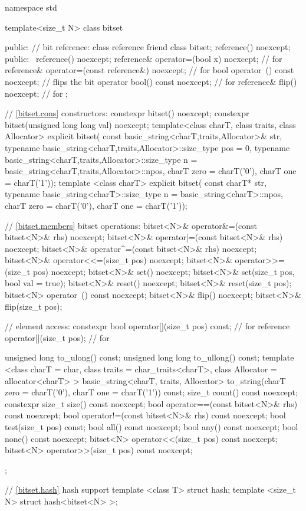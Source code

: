 \begin{codeblock}
namespace std {
  template<size_t N> class bitset {
  public:
    // bit reference:
    class reference {
      friend class bitset;
      reference() noexcept;
    public:
     ~reference() noexcept;
      reference& operator=(bool x) noexcept;             // for 
      reference& operator=(const reference&) noexcept;   // for 
      bool operator~() const noexcept;                   // flips the bit
      operator bool() const noexcept;                    // for 
      reference& flip() noexcept;                        // for 
    };

    // \ref{bitset.cons} constructors:
    constexpr bitset() noexcept;
    constexpr bitset(unsigned long long val) noexcept;
    template<class charT, class traits, class Allocator>
      explicit bitset(
        const basic_string<charT,traits,Allocator>& str,
        typename basic_string<charT,traits,Allocator>::size_type pos = 0,
        typename basic_string<charT,traits,Allocator>::size_type n =
          basic_string<charT,traits,Allocator>::npos,
          charT zero = charT('0'), charT one = charT('1'));
    template <class charT>
      explicit bitset(
        const charT* str,
        typename basic_string<charT>::size_type n = basic_string<charT>::npos,
        charT zero = charT('0'), charT one = charT('1'));

    // \ref{bitset.members} bitset operations:
    bitset<N>& operator&=(const bitset<N>& rhs) noexcept;
    bitset<N>& operator|=(const bitset<N>& rhs) noexcept;
    bitset<N>& operator^=(const bitset<N>& rhs) noexcept;
    bitset<N>& operator<<=(size_t pos) noexcept;
    bitset<N>& operator>>=(size_t pos) noexcept;
    bitset<N>& set() noexcept;
    bitset<N>& set(size_t pos, bool val = true);
    bitset<N>& reset() noexcept;
    bitset<N>& reset(size_t pos);
    bitset<N>  operator~() const noexcept;
    bitset<N>& flip() noexcept;
    bitset<N>& flip(size_t pos);

    // element access:
    constexpr bool operator[](size_t pos) const;       // for 
    reference operator[](size_t pos);                  // for 

    unsigned long to_ulong() const;
    unsigned long long to_ullong() const;
    template <class charT = char,
        class traits = char_traits<charT>,
        class Allocator = allocator<charT> >
      basic_string<charT, traits, Allocator>
      to_string(charT zero = charT('0'), charT one = charT('1')) const;
    size_t count() const noexcept;
    constexpr size_t size() const noexcept;
    bool operator==(const bitset<N>& rhs) const noexcept;
    bool operator!=(const bitset<N>& rhs) const noexcept;
    bool test(size_t pos) const;
    bool all() const noexcept;
    bool any() const noexcept;
    bool none() const noexcept;
    bitset<N> operator<<(size_t pos) const noexcept;
    bitset<N> operator>>(size_t pos) const noexcept;
  };

  // \ref{bitset.hash} hash support
  template <class T> struct hash;
  template <size_t N> struct hash<bitset<N> >;
}
\end{codeblock}

